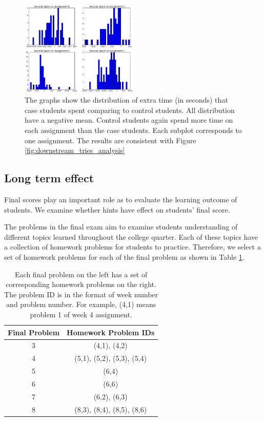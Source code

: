 \documentclass{sigchi/sigchi}
\begin{document}
\begin{figure}[ht]
\includegraphics[width=0.5\textwidth]{image/assignment_time_downstream.png}
\caption{The graphs show the distribution of extra time (in seconds) that case students spent comparing to control students. All distribution have a negative mean. Control students again spend more time on each assignment than the case students. Each subplot corresponds to one assignment. The results are consistent with Figure \ref{fig:downstream_tries_analysis}}
    \label{fig:downstream_time_analysis}
\end{figure}

\subsection{Long term effect}
Final scores play an important role as to evaluate the learning outcome of students. We examine whether hints have effect on students' final score.

The problems in the final exam aim to examine students understanding of different topics learned throughout the college quarter. Each of these topics have a collection of homework problems for students to practice. Therefore, we select a set of homework problems for each of the final problem as shown in Table \ref{tab:map}.

\begin{table}[h]
\caption{Each final problem on the left has a set of corresponding homework problems on the right. The problem ID is in the format of week number and problem number. For example, (4,1) means problem 1 of week 4 assignment.}
\begin{center}
  \begin{tabular}{ c | c }
   Final Problem & Homework Problem IDs \\ \hline
	3 & (4,1), (4,2) \\
	4 & (5,1), (5,2), (5,3), (5,4) \\
    5 & (6,4) \\
    6 & (6,6) \\
    7 & (6,2), (6,3) \\
    8 & (8,3), (8,4), (8,5), (8,6) \\ \hline
  \end{tabular}
  \label{tab:map}
  \end{center}
\end{table}
\end{document}
